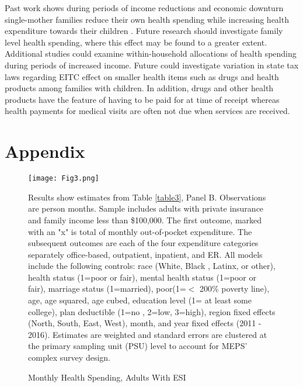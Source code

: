 \documentclass[smallcondensed,referee]{svjour3}
\begin{document}
Past work shows during periods of income reductions and economic downturn single-mother families reduce their own health spending while increasing health expenditure towards their children \citep{monheit_how_2020}. Future research should investigate family level health spending, where this effect may be found to a greater extent. Additional studies could examine within-household allocations of health spending during periods of increased income. Future could investigate variation in state tax laws regarding EITC effect on smaller health items such as drugs and health products among families with children. In addition, drugs and other health products have the feature of having to be paid for at time of receipt whereas health payments for medical visits are often not due when services are received.    



\clearpage

\singlespacing
\singlespacing






\section{Appendix}
\begin{figure}
    \centering
\texttt{[image: Fig3.png]}
    \caption{Monthly Health Spending, Adults With ESI}\label{Fig3}
    	\begin{minipage}{15cm}
		\footnotesize
Results show estimates from Table \ref{table3}, Panel B. Observations are person months. 
  Sample includes adults with private insurance and family income less than \$100,000. The first outcome, marked with an "x"  is total of monthly out-of-pocket expenditure. The subsequent outcomes are each of the four expenditure categories separately office-based, outpatient, inpatient, and ER.  All models include the following controls:  race (White, Black , Latinx, or other), health status (1=poor or fair), mental health status (1=poor or fair), marriage status (1=married), poor(1=$<$ 200\% poverty line), age, age squared, age cubed, education level (1= at least some college), plan deductible (1=no , 2=low, 3=high), region fixed effects (North, South, East, West), month, and year fixed effects (2011 - 2016). Estimates are weighted and standard errors are clustered at the primary sampling unit (PSU) level to account for MEPS’ complex survey design.
	\end{minipage}
\end{figure}
\FloatBarrier
\end{document}
